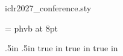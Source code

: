 \begin{filecontents*}[overwrite]{iclr2027_conference.sty}

%
%

%
\usepackage{eso-pic} %
\RequirePackage{fancyhdr}
\RequirePackage{natbib}


\renewcommand{\topfraction}{0.95}   %
\renewcommand{\textfraction}{0.05}  %

\newif\ificlrfinal
\iclrfinalfalse
\def\iclrfinalcopy{\iclrfinaltrue}
\font\iclrtenhv  = phvb at 8pt


\setlength{\paperheight}{11in}
\setlength{\paperwidth}{8.5in}


\oddsidemargin .5in    %
\evensidemargin .5in
 true in
\topmargin -0.625in
\addtolength{\headsep}{0.25in}
 true in       %
 true in        %

\flushbottom \sloppy

\def\addcontentsline#1#2#3{}


\end{filecontents*}
